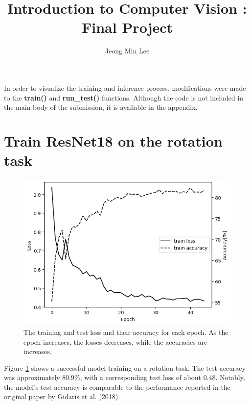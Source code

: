 \documentclass[10pt]{article}
\title{\textbf{Introduction to Computer Vision : Final Project}}
\author{Jeong Min Lee}
\begin{document}
\maketitle
In order to visualize the training and inference process, modifications were made to the \textbf{train()} and \textbf{run\_test()} functions. Although the code is not included in the main body of the submission, it is available in the appendix.

\section{Train ResNet18 on the rotation task}
\begin{figure}[!h]
    \begin{center}
        \includegraphics*[scale = 0.5]{"fig/self_supervised.png"}
    \end{center}
    \caption{The training and test loss and their accuracy for each epoch. As the epoch increases, the losses decreases, while the accuracies are increases.}
    \label{fig1}
\end{figure}

Figure \ref{fig1} shows a successful model training on a rotation task.
 The test accuracy was approximately 80.9\%, with a corresponding test loss of about 0.48. 
 Notably, the model's test accuracy is comparable to the performance reported in the original paper by Gidaris et al. (2018)\cite{Gidaris2018}
\end{document}
